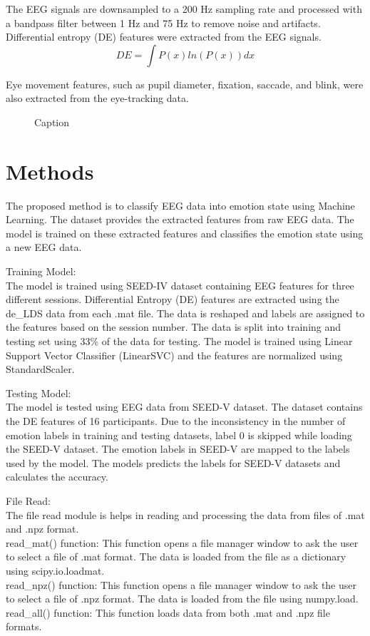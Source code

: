 \documentclass[12pt, a4paper]{report}
\begin{document}
The EEG signals are downsampled to a 200 Hz sampling rate and processed with a bandpass filter between 1 Hz and 75 Hz to remove noise and artifacts. Differential entropy (DE) features were extracted from the EEG signals.
\[DE = \int P(x) ln(P(x)) dx\]

Eye movement features, such as pupil diameter, fixation, saccade, and blink, were also extracted from the eye-tracking data.


\begin{figure}[h]
    \centering
    \caption{Caption}
    \label{fig:mesh1}
\end{figure}

\section{Methods}
The proposed method is to classify EEG data into emotion state using Machine Learning. The dataset provides the extracted features from raw EEG data. The model is trained on these extracted features and classifies the emotion state using a new EEG data.

Training Model:
\\ The model is trained using SEED-IV dataset containing EEG features for three different sessions. Differential Entropy (DE) features are extracted using the de\_LDS data from each .mat file. The data is reshaped and labels are assigned to the features based on the session number. The data is split into training and testing set using 33\% of the data for testing. The model is trained using Linear Support Vector Classifier (LinearSVC) and the features are normalized using StandardScaler.

Testing Model:
\\ The model is tested using EEG data from SEED-V dataset. The dataset contains the DE features of 16 participants. Due to the inconsistency in the number of emotion labels in training and testing datasets, label 0 is skipped while loading the SEED-V dataset. The emotion labels in SEED-V are mapped to the labels used by the model. The models predicts the labels for SEED-V datasets and calculates the accuracy.

File Read:
\\ The file read module is helps in reading and processing the data from files of .mat and .npz format. 
\\ read\_mat() function: This function opens a file manager window to ask the user to select a file of .mat format. The data is loaded from the file as a dictionary using scipy.io.loadmat. 
\\ read\_npz() function: This function opens a file manager window to ask the user to select a file of .npz format. The data is loaded from the file using numpy.load.
\\ read\_all() function: This function loads data from both .mat and .npz file formats.
\end{document}
